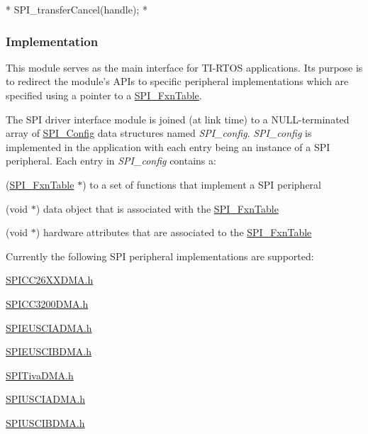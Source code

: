 \begin{DoxyCode}
*  SPI_transferCancel(handle);
*  
\end{DoxyCode}


\subsubsection*{Implementation}

This module serves as the main interface for T\-I-\/\-R\-T\-O\-S applications. Its purpose is to redirect the module's A\-P\-Is to specific peripheral implementations which are specified using a pointer to a \hyperlink{struct_s_p_i___fxn_table}{S\-P\-I\-\_\-\-Fxn\-Table}.

The S\-P\-I driver interface module is joined (at link time) to a N\-U\-L\-L-\/terminated array of \hyperlink{struct_s_p_i___config}{S\-P\-I\-\_\-\-Config} data structures named {\itshape S\-P\-I\-\_\-config}. {\itshape S\-P\-I\-\_\-config} is implemented in the application with each entry being an instance of a S\-P\-I peripheral. Each entry in {\itshape S\-P\-I\-\_\-config} contains a\-:
\begin{DoxyItemize}
\item (\hyperlink{struct_s_p_i___fxn_table}{S\-P\-I\-\_\-\-Fxn\-Table} $\ast$) to a set of functions that implement a S\-P\-I peripheral
\item (void $\ast$) data object that is associated with the \hyperlink{struct_s_p_i___fxn_table}{S\-P\-I\-\_\-\-Fxn\-Table}
\item (void $\ast$) hardware attributes that are associated to the \hyperlink{struct_s_p_i___fxn_table}{S\-P\-I\-\_\-\-Fxn\-Table}
\end{DoxyItemize}

Currently the following S\-P\-I peripheral implementations are supported\-:
\begin{DoxyItemize}
\item \hyperlink{_s_p_i_c_c26_x_x_d_m_a_8h}{S\-P\-I\-C\-C26\-X\-X\-D\-M\-A.\-h}
\item \hyperlink{_s_p_i_c_c3200_d_m_a_8h}{S\-P\-I\-C\-C3200\-D\-M\-A.\-h}
\item \hyperlink{_s_p_i_e_u_s_c_i_a_d_m_a_8h}{S\-P\-I\-E\-U\-S\-C\-I\-A\-D\-M\-A.\-h}
\item \hyperlink{_s_p_i_e_u_s_c_i_b_d_m_a_8h}{S\-P\-I\-E\-U\-S\-C\-I\-B\-D\-M\-A.\-h}
\item \hyperlink{_s_p_i_tiva_d_m_a_8h}{S\-P\-I\-Tiva\-D\-M\-A.\-h}
\item \hyperlink{_s_p_i_u_s_c_i_a_d_m_a_8h}{S\-P\-I\-U\-S\-C\-I\-A\-D\-M\-A.\-h}
\item \hyperlink{_s_p_i_u_s_c_i_b_d_m_a_8h}{S\-P\-I\-U\-S\-C\-I\-B\-D\-M\-A.\-h}
\end{DoxyItemize}

